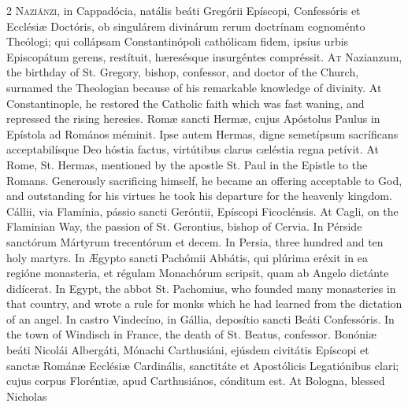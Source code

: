 \begin{paracol}{2}
\lettrine[lines=2]{N}{aziánzi,} in 
 Cappadócia, natális beáti Gregórii Epíscopi, Confessóris et Ecclésiæ 
 Doctóris, ob singulárem divinárum rerum doctrínam cognoménto Theólogi; qui 
 collápsam Constantinópoli cathólicam fidem, ipsíus urbis Episcopátum gerens, 
 restítuit, hæresésque insurgéntes compréssit.
\switchcolumn
{}
\lettrine[lines=2]{A}{t} Nazianzum, the birthday of St. 
 Gregory, bishop, confessor, and doctor of the Church, surnamed the 
 Theologian because of his remarkable knowledge of divinity. At 
 Constantinople, he restored the Catholic faith which was fast waning, and 
 repressed the rising heresies.
\switchcolumn*
{}
Romæ sancti Hermæ, 
 cujus Apóstolus Paulus in Epístola ad Romános méminit. Ipse autem 
 Hermas, digne semetípsum sacríficans acceptabilísque Deo hóstia factus, 
 virtútibus clarus cæléstia regna petívit.
\switchcolumn
{}
At Rome, St. Hermas, mentioned by 
 the apostle St. Paul in the Epistle to the Romans. Generously 
 sacrificing himself, he became an offering acceptable to God, and 
 outstanding for his virtues he took his departure for the heavenly kingdom.
\switchcolumn*
{}
Cállii, via Flamínia, 
 pássio sancti Geróntii, Epíscopi Ficoclénsis.
\switchcolumn
{}
At Cagli, on the Flaminian Way, the 
 passion of St. Gerontius, bishop of Cervia.
\switchcolumn*
{}
In Pérside sanctórum 
 Mártyrum trecentórum et decem.
\switchcolumn
{}
In Persia, three hundred and ten 
 holy martyrs.
\switchcolumn*
{}
In Ægypto sancti 
 Pachómii Abbátis, qui plúrima eréxit in ea regióne monasteria, et régulam 
 Monachórum scripsit, quam ab Angelo dictánte didícerat.
\switchcolumn
{}
In Egypt, the abbot St. Pachomius, 
 who founded many monasteries in that country, and wrote a rule for monks 
 which he had learned from the dictation of an angel.
\switchcolumn*
{}
In castro Vindecíno, 
 in Gállia, deposítio sancti Beáti Confessóris.
\switchcolumn
{}
In the town of Windisch in France, 
 the death of St. Beatus, confessor.
\switchcolumn*
{}
Bonóniæ beáti Nicolái 
 Albergáti, Mónachi Carthusiáni, ejúsdem civitátis Epíscopi et sanctæ Románæ 
 Ecclésiæ Cardinális, sanctitáte et Apostólicis Legatiónibus clari; cujus 
 corpus Floréntiæ, apud Carthusiános, cónditum est.
\switchcolumn
{}
At Bologna, blessed Nicholas 

\end{paracol}
